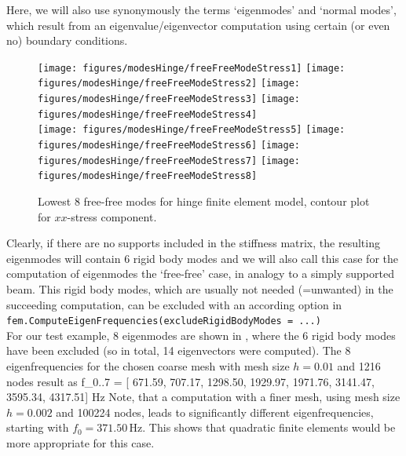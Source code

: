 Here, we will also use synonymously the terms `eigenmodes' and `normal modes', which result from an eigenvalue/eigenvector computation using certain (or even no) boundary conditions.
\begin{figure}[tbph]
  \begin{center}
  \texttt{[image: figures/modesHinge/freeFreeModeStress1]}
  \texttt{[image: figures/modesHinge/freeFreeModeStress2]}
  \texttt{[image: figures/modesHinge/freeFreeModeStress3]}
  \texttt{[image: figures/modesHinge/freeFreeModeStress4]}\\
  \texttt{[image: figures/modesHinge/freeFreeModeStress5]}
  \texttt{[image: figures/modesHinge/freeFreeModeStress6]}
  \texttt{[image: figures/modesHinge/freeFreeModeStress7]}
  \texttt{[image: figures/modesHinge/freeFreeModeStress8]}
  \end{center}
  \caption{Lowest 8 free-free modes for hinge finite element model, contour plot for $xx$-stress component.}
  \label{fig_hingePartFreeFreeModes}
\end{figure}

Clearly, if there are no supports included in the stiffness matrix, the resulting eigenmodes will contain 6 rigid body modes and we will also call this case for the computation of eigenmodes the `free-free' case, in analogy to a simply supported beam.
This rigid body modes, which are usually not needed (=unwanted) in the succeeding computation, can be excluded with an according option in \vspace{6pt}\\
\texttt{fem.ComputeEigenFrequencies(excludeRigidBodyModes = ...)}
\vspace{12pt}\\
For our test example, 8 eigenmodes are shown in , where the 6 rigid body modes have been excluded (so in total, 14 eigenvectors were computed).
The 8 eigenfrequencies for the chosen coarse mesh with mesh size $h=0.01$ and 1216 nodes result as 
\be
  f_{0..7} = [ 671.59, 707.17, 1298.50, 1929.97, 1971.76, 3141.47, 3595.34, 4317.51] Hz
\ee
Note, that a computation with a finer mesh, using mesh size $h=0.002$ and 100224 nodes, leads to significantly different eigenfrequencies, starting with $f_0=371.50\,$Hz. This shows that quadratic finite elements would be more appropriate for this case.

